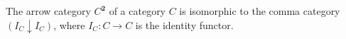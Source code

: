 The arrow category $C^{\mathbf{2}}$ of a category $C$ is isomorphic to the comma category $(I_C \downarrow I_C)$, where $I_C: C \to C$ is the identity functor.
